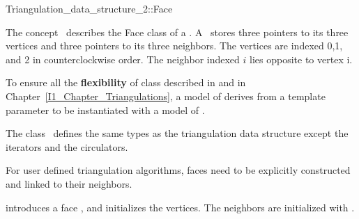 

\begin{ccRefConcept}{Triangulation_data_structure_2::Face}


\ccDefinition
  
The concept \ccRefName\  describes the Face class of a 
.
A \ccRefName\ stores three pointers to its three vertices
and three pointers to its three neighbors.
The vertices are indexed 0,1, and 2 in counterclockwise order.
The  neighbor indexed $i$ lies
opposite to vertex i.

To ensure all the \textbf{flexibility} of class 
described in 
and in Chapter~\ref{I1_Chapter_Triangulations}, a model of 
\ccRefName derives from a template parameter
 to be instantiated with a model of 
.

\ccTypes
The class \ccRefName\ defines the same types as 
the triangulation data structure 
except the iterators and the circulators.

\begin{ccAdvanced}
\ccCreation

For user defined triangulation algorithms, faces need to
be explicitly constructed and linked to their neighbors.


{introduces a face \ccVar, and initializes the vertices. The 
neighbors are initialized with .}


\end{ccAdvanced}
\end{ccRefConcept}
